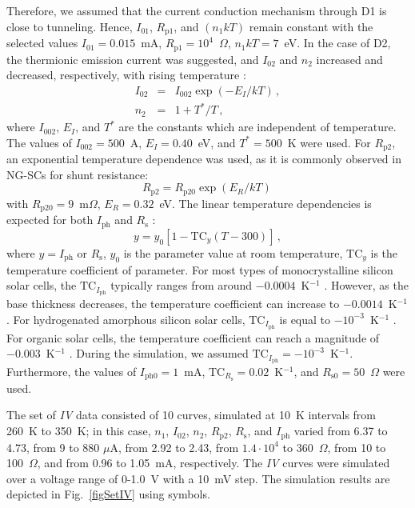 \documentclass[a4paper,fleqn]{cas-sc}
\begin{document}
Therefore, we assumed that the current conduction mechanism through D1 is close to tunneling.
Hence, $I_{01}$, $R_\mathrm{p1}$, and $(n_1kT)$ remain constant with the selected values
$I_{01}=0.015$~mA, $R_\mathrm{p1}=10^4$~$\Omega$, $n_1kT=7$~eV.
In the case of D2, the thermionic emission current was suggested,
and $I_{02}$ and $n_2$ increased and decreased, respectively, with rising temperature \cite{Sze2012}:
\begin{eqnarray}
I_{02}&=& I_{002}\exp\left(-E_I/kT\right)\,,\\
n_2&=&1+T^*/T\,,
\end{eqnarray}
where
$I_{002}$, $E_I$, and $T^*$ are the constants which are independent of temperature.
The values of $I_{002}=500$~A, $E_I=0.40$~eV, and $T^*=500$~K were used.
For $R_\mathrm{p2}$, an exponential temperature dependence was used,
as it is commonly observed \cite{Kondratenko2019} in NG-SCs for shunt resistance:
\begin{equation}
R_\mathrm{p2}=R_\mathrm{p20}\exp\left(E_R/kT\right)\,
\end{equation}
with
$R_\mathrm{p20}=9$~m$\Omega$,
$E_R=0.32$~eV.
The linear temperature dependencies is expected for both $I_\mathrm{ph}$ \cite{Green2003,Eberle2021} and $R_\mathrm{s}$ \cite{Ibrahim2017,Bradaschia2019}:
\begin{equation}
y=y_{0}[1-\mathrm{TC}_y(T-300)]\,,
\end{equation}
where
$y=I_\mathrm{ph}$ or $R_\mathrm{s}$,
$y_0$ is the parameter value at room temperature,
$\mathrm{TC}_y$ is the temperature coefficient of parameter.
For most types of monocrystalline silicon solar cells, the $\mathrm{TC}_{I_\mathrm{ph}}$ typically ranges from around $-0.0004$~K$^{-1}$ \cite{TuanLe2021}.
However, as the base thickness decreases, the temperature coefficient can increase to $-0.0014$~K$^{-1}$ \cite{Dupre2016}.
For hydrogenated amorphous silicon solar cells, $\mathrm{TC}_{I_\mathrm{ph}}$ is equal to $-10^{-3}$~K$^{-1}$ \cite{Riesen2016}.
For organic solar cells, the temperature coefficient can reach a magnitude of $-0.003$~K$^{-1}$ \cite{Rana2018}.
During the simulation, we assumed $\mathrm{TC}_{I_\mathrm{ph}}=-10^{-3}$~K$^{-1}$.
Furthermore, the values of $I_\mathrm{ph0}=1$~mA,
$\mathrm{TC}_{R_\mathrm{s}}=0.02$~K$^{-1}$,
and $R_\mathrm{s0}=50$~$\Omega$ were used.


The set of \emph{IV} data consisted of 10 curves,
simulated at 10~K intervals from 260~K to 350~K;
in this case,
$n_1$,
$I_{02}$,
$n_2$,
$R_\mathrm{p2}$,
$R_\mathrm{s}$,
and $I_\mathrm{ph}$
varied
from 6.37 to 4.73,
from 9 to 880 $\mu$A,
from 2.92 to 2.43,
from $1.4\cdot10^4$ to 360~$\Omega$,
from 10 to 100~$\Omega$,
and from 0.96 to 1.05~mA, respectively.
The \emph{IV} curves were simulated over a voltage range of 0-1.0~V with a 10~mV step.
The simulation results are depicted in Fig.~\ref{figSetIV} using symbols.
\end{document}
